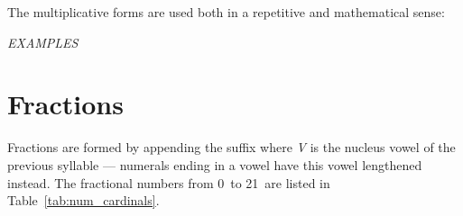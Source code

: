 \documentclass[grammar]{subfiles}
\begin{document}
  \begin{table}[htpb]\small\capstart
      \qquad
      \caption{Multiplicative numerals from 0\dec\ to 23\dec\label{tab:num_multiplicatives}}
  \end{table}

  The multiplicative forms are used both in a repetitive and mathematical sense:

  \begin{exe}
    \ex \emph{EXAMPLES}
  \end{exe}

  \section{Fractions}
  \label{sec:num_fractions}

  Fractions are formed by appending the suffix  where \textit{V} is the nucleus vowel of the previous syllable — numerals ending in a vowel have this vowel lengthened instead. The fractional numbers from 0\dec\ to 21\dec\ are listed in Table~\ref{tab:num_cardinals}.
\end{document}
